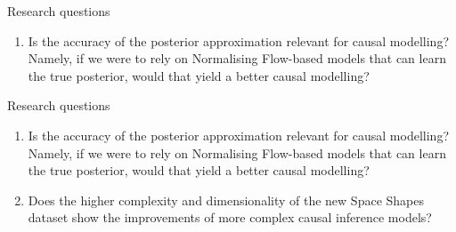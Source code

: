 \documentclass[dvipsnames, aspectratio=169]{beamer}
\begin{document}
	\begin{frame}{Research questions}
    \begin{enumerate}
        \item Is the accuracy of the posterior approximation relevant for causal modelling? Namely, if we were to rely on Normalising Flow-based models that can learn the true posterior, would that yield a better causal modelling? 
    \end{enumerate} 
	\end{frame}
		\begin{frame}{Research questions}
    \begin{enumerate}
        \item Is the accuracy of the posterior approximation relevant for causal modelling? Namely, if we were to rely on Normalising Flow-based models that can learn the true posterior, would that yield a better causal modelling? 
        \item Does the higher complexity and dimensionality of the new Space Shapes dataset show the improvements of more complex causal inference models?
    \end{enumerate} 
	\end{frame}
	
\end{document}
